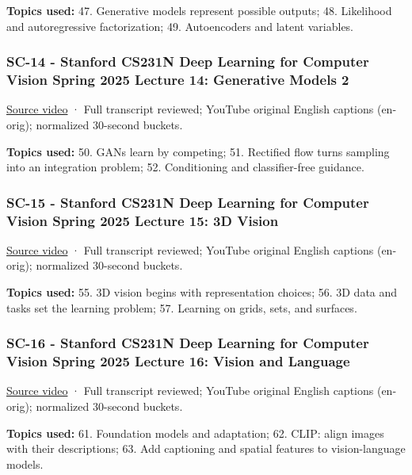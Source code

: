 \textbf{Topics used:} 47. Generative models represent possible outputs; 48. Likelihood and autoregressive factorization; 49. Autoencoders and latent variables.

\subsubsection{SC-14 - Stanford CS231N Deep Learning for Computer Vision Spring 2025 Lecture 14: Generative Models 2}\label{04-visual-computing-ii-ch036-sc-14---stanford-cs231n-deep-learning-for-computer-vision-spring-2025-lecture-14-generative-models-2}

\href{https://www.youtube.com/watch?v=Edr4uZFh4EE}{Source video} · Full transcript reviewed; YouTube original English captions (en-orig); normalized 30-second buckets.

\textbf{Topics used:} 50. GANs learn by competing; 51. Rectified flow turns sampling into an integration problem; 52. Conditioning and classifier-free guidance.

\subsubsection{SC-15 - Stanford CS231N Deep Learning for Computer Vision Spring 2025 Lecture 15: 3D Vision}\label{04-visual-computing-ii-ch036-sc-15---stanford-cs231n-deep-learning-for-computer-vision-spring-2025-lecture-15-3d-vision}

\href{https://www.youtube.com/watch?v=7lxrKDKtykM}{Source video} · Full transcript reviewed; YouTube original English captions (en-orig); normalized 30-second buckets.

\textbf{Topics used:} 55. 3D vision begins with representation choices; 56. 3D data and tasks set the learning problem; 57. Learning on grids, sets, and surfaces.

\subsubsection{SC-16 - Stanford CS231N Deep Learning for Computer Vision Spring 2025 Lecture 16: Vision and Language}\label{04-visual-computing-ii-ch036-sc-16---stanford-cs231n-deep-learning-for-computer-vision-spring-2025-lecture-16-vision-and-language}

\href{https://www.youtube.com/watch?v=mQOK0Mfyrkk}{Source video} · Full transcript reviewed; YouTube original English captions (en-orig); normalized 30-second buckets.

\textbf{Topics used:} 61. Foundation models and adaptation; 62. CLIP: align images with their descriptions; 63. Add captioning and spatial features to vision-language models.


